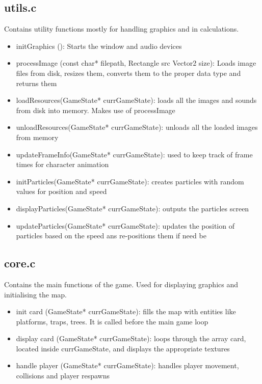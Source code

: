 \documentclass{article}
\begin{document}
\subsection{utils.c}
Contains utility functions mostly for handling graphics and in calculations. 
\begin{itemize}
    \item \textunderscore initGraphics (): Starts the window and audio devices
    \item \textunderscore processImage (const char* filepath, Rectangle src
    Vector2 size): Loads image files from disk, resizes them, converts them
    to the proper data type and returns them
    \item \textunderscore loadResources(GameState* currGameState): loads all the images and
    sounds from disk into memory. Makes use of \textunderscore processImage
    \item \textunderscore unloadResources(GameState* currGameState): unloads all the loaded 
    images from memory
    \item \textunderscore updateFrameInfo(GameState* currGameState): used to keep track 
    of frame times for character animation
    \item \textunderscore initParticles(GameState* currGameState): creates particles
    with random values for position and speed
    \item \textunderscore displayParticles(GameState* currGameState): 
        outputs the particles screen
    \item \textunderscore updateParticles(GameState* currGameState): 
        updates the position of 
    particles based on the speed ans re-positions them if need be
\end{itemize}

\subsection{core.c}
Contains the main functions of the game. Used for displaying graphics and initialising
the map.
\begin{itemize}
    \item \textunderscore init \textunderscore card (GameState* currGameState): fills the map 
    with entities like platforms, traps, trees. It is called before the 
    main game loop
    \item \textunderscore display \textunderscore card (GameState* currGameState): loops through
    the array card, located inside currGameState, and displays the appropriate textures
    \item \textunderscore handle \textunderscore player (GameState* currGameState): handles player movement,
    collisions and player respawns
\end{itemize}
\end{document}
